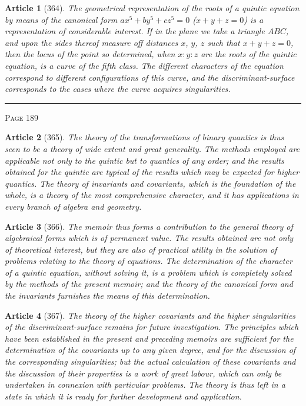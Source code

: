 \documentclass[11pt,a4paper]{article}
\theoremstyle{cayley}
\newtheorem{art}{Article}
\begin{document}
\begin{art}[364]
The geometrical representation of the roots of a quintic equation by means of the canonical form $ax^5 + by^5 + cz^5 = 0$ ($x+y+z=0$) is a representation of considerable interest. If in the plane we take a triangle $ABC$, and upon the sides thereof measure off distances $x$, $y$, $z$ such that $x+y+z=0$, then the locus of the point so determined, when $x:y:z$ are the roots of the quintic equation, is a curve of the fifth class. The different characters of the equation correspond to different configurations of this curve, and the discriminant-surface corresponds to the cases where the curve acquires singularities.
\end{art}

\vspace{1em}
\noindent\rule{\textwidth}{0.4pt}
\begin{center}\textsc{Page 189}\end{center}
\newpage

\begin{art}[365]
The theory of the transformations of binary quantics is thus seen to be a theory of wide extent and great generality. The methods employed are applicable not only to the quintic but to quantics of any order; and the results obtained for the quintic are typical of the results which may be expected for higher quantics. The theory of invariants and covariants, which is the foundation of the whole, is a theory of the most comprehensive character, and it has applications in every branch of algebra and geometry.
\end{art}

\begin{art}[366]
The memoir thus forms a contribution to the general theory of algebraical forms which is of permanent value. The results obtained are not only of theoretical interest, but they are also of practical utility in the solution of problems relating to the theory of equations. The determination of the character of a quintic equation, without solving it, is a problem which is completely solved by the methods of the present memoir; and the theory of the canonical form and the invariants furnishes the means of this determination.
\end{art}

\begin{art}[367]
The theory of the higher covariants and the higher singularities of the discriminant-surface remains for future investigation. The principles which have been established in the present and preceding memoirs are sufficient for the determination of the covariants up to any given degree, and for the discussion of the corresponding singularities; but the actual calculation of these covariants and the discussion of their properties is a work of great labour, which can only be undertaken in connexion with particular problems. The theory is thus left in a state in which it is ready for further development and application.
\end{art}
\end{document}

